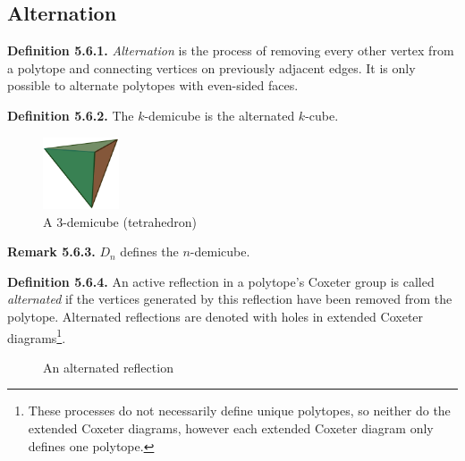 \documentclass[../main.tex]{subfiles}
\begin{document}
\subsection{Alternation}

\noindent\textbf{Definition 5.6.1.} \textit{Alternation} is the process of removing every other vertex from a polytope and connecting vertices on previously adjacent edges. It is only possible to alternate polytopes with even-sided faces.\newline

\noindent\textbf{Definition 5.6.2.} The $k$-demicube is the alternated $k$-cube.\newline

\begin{figure}[ht]
    \centering
    \includegraphics[width=0.2\textwidth]{uniform/Tetrahedron.png}
    \caption{A $3$-demicube (tetrahedron)}
    \label{}
\end{figure}

\noindent\textbf{Remark 5.6.3.} $D_n$ defines the $n$-demicube.\newline

\noindent\textbf{Definition 5.6.4.} An active reflection in a polytope's Coxeter group is called \textit{alternated} if the vertices generated by this reflection have been removed from the polytope. Alternated reflections are denoted with holes in extended Coxeter diagrams\footnote{These processes do not necessarily define unique polytopes, so neither do the extended Coxeter diagrams, however each extended Coxeter diagram only defines one polytope.}.\newline

\begin{figure}[!h]
\centering
{}
\caption{An alternated reflection}
\end{figure}
\end{document}
